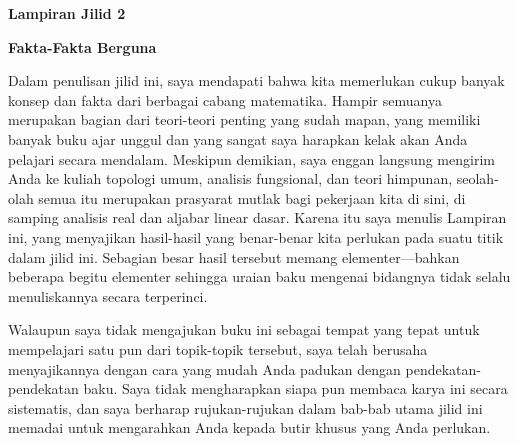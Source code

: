 
\def\RoverC{\hbox{\biggerscriptfonts${{\Bbb R}\atop{\Bbb C}}$}}

\def\chaptername{Lampiran}
\def\sectionname{Pendahuluan}

\gdef\topparagraph{}
\gdef\bottomparagraph{Lampiran Jilid 2 {\it pendahuluan}}

\centerline{\bf Lampiran Jilid 2}

\medskip

\centerline{\bf Fakta-Fakta Berguna}

\medskip

Dalam penulisan jilid ini, saya mendapati bahwa kita memerlukan cukup banyak
konsep dan fakta dari berbagai cabang matematika. Hampir semuanya merupakan
bagian dari teori-teori penting yang sudah mapan, yang memiliki banyak buku
ajar unggul dan yang sangat saya harapkan kelak akan Anda pelajari secara
mendalam. Meskipun demikian, saya enggan langsung mengirim Anda ke kuliah
topologi umum, analisis fungsional, dan teori himpunan, seolah-olah semua itu
merupakan prasyarat mutlak bagi pekerjaan kita di sini, di samping analisis
real dan aljabar linear dasar. Karena itu saya menulis Lampiran ini, yang
menyajikan hasil-hasil yang benar-benar kita perlukan pada suatu titik dalam
jilid ini. Sebagian besar hasil tersebut memang elementer---bahkan beberapa
begitu elementer sehingga uraian baku mengenai bidangnya tidak selalu
menuliskannya secara terperinci.

Walaupun saya tidak mengajukan buku ini sebagai tempat yang tepat untuk
mempelajari satu pun dari topik-topik tersebut, saya telah berusaha
menyajikannya dengan cara yang mudah Anda padukan dengan pendekatan-pendekatan
baku. Saya tidak mengharapkan siapa pun membaca karya ini secara sistematis,
dan saya berharap rujukan-rujukan dalam bab-bab utama jilid ini memadai untuk
mengarahkan Anda kepada butir khusus yang Anda perlukan.

\discrpage

